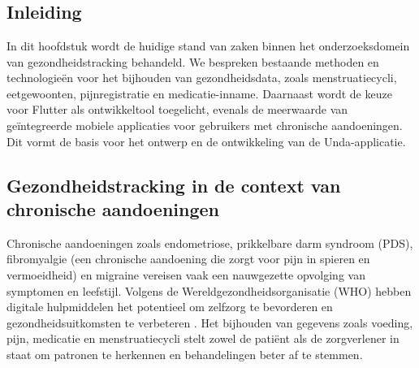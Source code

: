 \chapter{}%
\label{ch:stand-van-zaken}



\section{Inleiding}

In dit hoofdstuk wordt de huidige stand van zaken binnen het onderzoeksdomein van gezondheidstracking behandeld. We bespreken bestaande methoden en technologieën voor het bijhouden van gezondheidsdata, zoals menstruatiecycli, eetgewoonten, pijnregistratie en medicatie-inname. Daarnaast wordt de keuze voor Flutter als ontwikkeltool toegelicht, evenals de meerwaarde van geïntegreerde mobiele applicaties voor gebruikers met chronische aandoeningen. Dit vormt de basis voor het ontwerp en de ontwikkeling van de Unda-applicatie.

\section{Gezondheidstracking in de context van chronische aandoeningen}
Chronische aandoeningen zoals endometriose, prikkelbare darm syndroom (PDS), fibromyalgie (een chronische aandoening die zorgt voor pijn in spieren en vermoeidheid) en migraine vereisen vaak een nauwgezette opvolging van symptomen en leefstijl. Volgens de Wereldgezondheidsorganisatie (WHO) hebben digitale hulpmiddelen het potentieel om zelfzorg te bevorderen en gezondheidsuitkomsten te verbeteren \autocite{WHO2021}. Het bijhouden van gegevens zoals voeding, pijn, medicatie en menstruatiecycli stelt zowel de patiënt als de zorgverlener in staat om patronen te herkennen en behandelingen beter af te stemmen.

